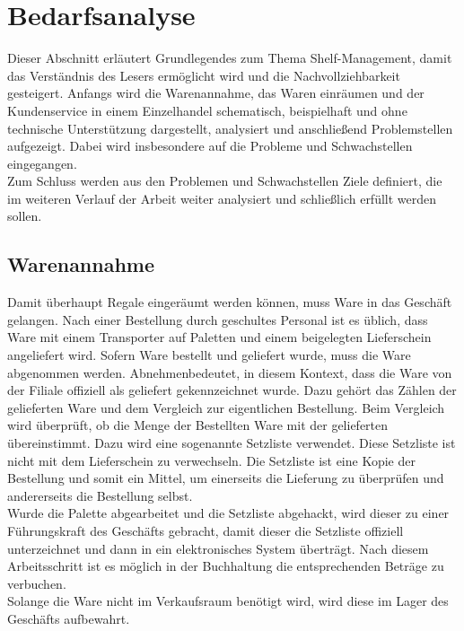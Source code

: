 \chapter{Bedarfsanalyse}
\label{cha:bedarfsanalyse}
Dieser Abschnitt erläutert Grundlegendes zum Thema Shelf-Management, damit das Verständnis des Lesers ermöglicht wird und die Nachvollziehbarkeit gesteigert. Anfangs wird die Warenannahme, das Waren einräumen und der Kundenservice in einem Einzelhandel schematisch, beispielhaft und ohne technische Unterstützung dargestellt, analysiert und anschließend Problemstellen aufgezeigt. Dabei wird insbesondere auf die Probleme und Schwachstellen eingegangen.\\

Zum Schluss werden aus den Problemen und Schwachstellen Ziele definiert, die im weiteren Verlauf der Arbeit weiter analysiert und schließlich erfüllt werden sollen.
\section{Warenannahme}
\label{cha:warenannahme}
Damit überhaupt Regale eingeräumt werden können, muss Ware in das Geschäft gelangen. Nach einer Bestellung durch geschultes Personal ist es üblich, dass Ware mit einem Transporter auf Paletten und einem beigelegten Lieferschein angeliefert wird. Sofern Ware bestellt und geliefert wurde, muss die Ware abgenommen werden. \glqq Abnehmen\grqq bedeutet, in diesem Kontext, dass die Ware von der Filiale offiziell als geliefert gekennzeichnet wurde. Dazu gehört das Zählen der gelieferten Ware und dem Vergleich zur eigentlichen Bestellung. Beim Vergleich wird überprüft, ob die Menge der Bestellten Ware mit der gelieferten übereinstimmt. Dazu wird eine sogenannte Setzliste verwendet. Diese Setzliste ist nicht mit dem Lieferschein zu verwechseln. Die Setzliste ist eine Kopie der Bestellung und somit ein Mittel, um einerseits die Lieferung zu überprüfen und andererseits die Bestellung selbst.\\

Wurde die Palette abgearbeitet und die Setzliste abgehackt, wird dieser zu einer Führungskraft des Geschäfts gebracht, damit dieser die Setzliste offiziell unterzeichnet und dann in ein elektronisches System überträgt. Nach diesem Arbeitsschritt ist es möglich in der Buchhaltung die entsprechenden Beträge zu verbuchen.\\

Solange die Ware nicht im Verkaufsraum benötigt wird, wird diese im Lager des Geschäfts aufbewahrt. \\

